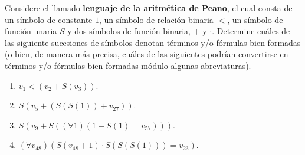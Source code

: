 \documentclass[12pt]{report}
\theoremstyle{largebreak}
\begin{document}
    \begin{sol}
    \end{sol}

    \begin{excer}
        Considere el llamado \textbf{lenguaje de la aritmética de Peano}, el cual consta de un símbolo de constante $1$, un símbolo de relación binaria $<$, un símbolo de función unaria $S$ y dos símbolos de función binaria, $+$ y $\cdot$. Determine cuáles de las siguiente sucesiones de símbolos denotan términos y/o fórmulas bien formadas (o bien, de manera más precisa, cuáles de las siguientes podrían convertirse en términos y/o fórmulas bien formadas módulo algunas abreviaturas).
        \begin{enumerate}[label=($\alph*$)]
            \item $v_1<(v_2+S(v_3))$.
            \item $S(v_5+(S(S(1))+v_27))$.
            \item $S(v_9+S((\forall 1)(1+S(1)=v_{57})))$.
            \item $(\forall v_{48})(S(v_{48}+1)\cdot S(S(S(1)))=v_{23})$.
        \end{enumerate}
    \end{excer}

    \begin{sol}
    \end{sol}
\end{document}
